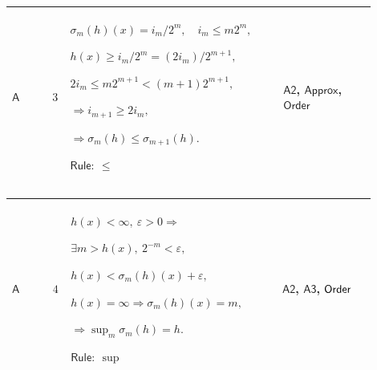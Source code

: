 \documentclass[12pt,reqno]{amsart}
\theoremstyle{blueplain}
\numberwithin{equation}{section}
\begin{document}
{\scriptsize \setlength{\parskip}{0pt}\nointerlineskip
\noindent 
\begin{tabular}{|@{}>{\centering\arraybackslash}m{0.10658\linewidth}|>{\centering\arraybackslash}m{0.03553\linewidth}|>{\centering\arraybackslash}m{0.52105\linewidth}|>{\centering\arraybackslash}m{0.23684\linewidth}|}
\hline
\hypertarget{dct:A3}{$\displaystyle \mathsf{A}$} & $\displaystyle 3$ & $%
\displaystyle \sigma_m(h)(x)=i_m/2^m,\quad i_m\le m2^m,$\par$\displaystyle %
h(x)\ge i_m/2^m=(2i_m)/2^{m+1},$\par$\displaystyle 2i_m\le
m2^{m+1}<(m+1)2^{m+1},$\par$\displaystyle \Rightarrow i_{m+1}\ge2i_m,$\par$%
\displaystyle \Rightarrow\sigma_m(h)\le\sigma_{m+1}(h).$\par$\displaystyle 
\mathsf{Rule}:\ \le$ & \hyperlink{dct:A2}{$\displaystyle \mathsf{A2}$}, 
\hyperlink{dctdef:Approx}{$\displaystyle \mathsf{Approx}$}, \hyperlink{ax:Order}%
{$\displaystyle \mathsf{Order}$} \\ \hline
\end{tabular}%
}

{\scriptsize \setlength{\parskip}{0pt}\nointerlineskip
\noindent 
\begin{tabular}{|@{}>{\centering\arraybackslash}m{0.10658\linewidth}|>{\centering\arraybackslash}m{0.03553\linewidth}|>{\centering\arraybackslash}m{0.52105\linewidth}|>{\centering\arraybackslash}m{0.23684\linewidth}|}
\hline
\hypertarget{dct:A4}{$\displaystyle \mathsf{A}$} & $\displaystyle 4$ & $%
\displaystyle h(x)<\infty,\ \varepsilon>0\Rightarrow$\par$\displaystyle %
\exists m>h(x),\ 2^{-m}<\varepsilon,$\par$\displaystyle h(x)<\sigma_m(h)(x)+%
\varepsilon,$\par$\displaystyle h(x)=\infty\Rightarrow\sigma_m(h)(x)=m,$\par$%
\displaystyle \Rightarrow\sup_m\sigma_m(h)=h.$\par$\displaystyle \mathsf{Rule%
}:\ \sup$ & \hyperlink{dct:A2}{$\displaystyle \mathsf{A2}$}, \hyperlink{dct:A3}%
{$\displaystyle \mathsf{A3}$}, \hyperlink{ax:Order}{$\displaystyle \mathsf{%
Order}$} \\ \hline
\end{tabular}%
}
\end{document}
